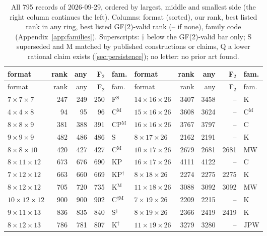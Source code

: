 \begingroup\scriptsize\setlength{\tabcolsep}{3.2pt}
\begin{longtable}{@{}lrrrl@{\hspace{6mm}}lrrrl@{}}
\caption{All 795 records of 2026-09-29, ordered by largest, middle and smallest side (the right column continues the left). Columns: format (sorted), our rank, best listed rank in any ring, best listed GF(2)-valid rank (-- if none), family code (Appendix~\ref{app:families}). Superscripts: $\dagger$ below the GF(2)-valid bar only; S superseded and M matched by published constructions or claims, Q a lower rational claim exists (\cref{sec:persistence}); no letter: no prior art found.}\label{tab:all}\\
\toprule format & rank & any & F$_2$ & fam. & format & rank & any & F$_2$ & fam.\\\midrule\endfirsthead
\toprule format & rank & any & F$_2$ & fam. & format & rank & any & F$_2$ & fam.\\\midrule\endhead
\bottomrule\endlastfoot
$7{\times}7{\times}7$ & 247 & 249 & 250 & F$^{\mathrm{S}}$ & $14{\times}16{\times}26$ & 3407 & 3458 & -- & K\\
$4{\times}4{\times}8$ & 94 & 95 & 96 & C$^{\mathrm{M}}$ & $15{\times}16{\times}26$ & 3608 & 3624 & -- & C$^{\mathrm{M}}$\\
$8{\times}8{\times}9$ & 381 & 388 & 391 & CP$^{\mathrm{M}}$ & $16{\times}16{\times}26$ & 3767 & 3797 & -- & C\\
$9{\times}9{\times}9$ & 482 & 486 & 486 & S & $8{\times}17{\times}26$ & 2162 & 2191 & -- & K\\
$8{\times}8{\times}10$ & 420 & 427 & 427 & C$^{\mathrm{M}}$ & $10{\times}17{\times}26$ & 2679 & 2681 & 2681 & MW\\
$8{\times}11{\times}12$ & 673 & 676 & 690 & KP & $16{\times}17{\times}26$ & 4111 & 4122 & -- & C\\
$7{\times}12{\times}12$ & 663 & 660 & 669 & KP$^{\dagger}$ & $8{\times}18{\times}26$ & 2274 & 2275 & 2275 & K\\
$8{\times}12{\times}12$ & 705 & 720 & 735 & K$^{\mathrm{M}}$ & $11{\times}18{\times}26$ & 3088 & 3092 & 3092 & MW\\
$10{\times}12{\times}12$ & 900 & 900 & 902 & C$^{\dagger\mathrm{M}}$ & $7{\times}19{\times}26$ & 2209 & 2215 & -- & K\\
$9{\times}11{\times}13$ & 836 & 835 & 840 & S$^{\dagger}$ & $8{\times}19{\times}26$ & 2366 & 2419 & 2419 & K\\
$8{\times}12{\times}13$ & 786 & 781 & 807 & K$^{\dagger}$ & $11{\times}19{\times}26$ & 3279 & 3280 & -- & JPW\\

\end{longtable}
